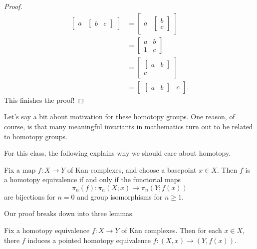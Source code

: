 \documentclass[../notes.tex]{subfiles}
\begin{document}
\begin{proof}
	\begin{align*}
		\begin{bmatrix}
			a & \begin{bmatrix}
				b & c
			\end{bmatrix}
		\end{bmatrix} &= \begin{bmatrix}
			a & \begin{bmatrix}
				b \\ c
			\end{bmatrix}
		\end{bmatrix} \\
		&= \begin{bmatrix}
			a & b \\
			1 & c
		\end{bmatrix} \\
		&= \begin{bmatrix}
			\begin{bmatrix}
				a & b
			\end{bmatrix} \\
			c
		\end{bmatrix} \\
		&= \begin{bmatrix}
			\begin{bmatrix}
				a & b
			\end{bmatrix} & c
		\end{bmatrix}.
	\end{align*}
	This finishes the proof!
\end{proof}
\begin{remark}
	Let's say a bit about motivation for these homotopy groups. One reason, of course, is that many meaningful invariants in mathematics turn out to be related to homotopy groups.
\end{remark}
For this class, the following explains why we should care about homotopy.
\begin{theorem}[Whitehead]
	Fix a map $f\colon X\to Y$ of Kan complexes, and choose a basepoint $x\in X$. Then $f$ is a homotopy equivalence if and only if the functorial maps
	\[\pi_n(f)\colon\pi_n(X;x)\to\pi_n(Y;f(x))\]
	are bijections for $n=0$ and group isomorphisms for $n\ge1$.
\end{theorem}
Our proof breaks down into three lemmas.
\begin{lemma}
	Fix a homotopy equivalence $f\colon X\to Y$ of Kan complexes. Then for each $x\in X$, there $f$ induces a pointed homotopy equivalence $f\colon(X,x)\to(Y,f(x))$.
\end{lemma}
\end{document}
